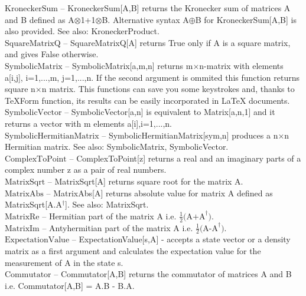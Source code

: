 \documentclass[a4paper,10pt]{scrartcl}
\begin{document}
\noindent\textbf{$ \text{KroneckerSum} $ }-- KroneckerSum[A,B] returns the Kronecker sum of matrices A and B defined as A$\otimes $1+1$\otimes $B. Alternative syntax A$\oplus $B for KroneckerSum[A,B] is also provided. See also: KroneckerProduct.$  $\\[8pt]
\noindent\textbf{$ \text{SquareMatrixQ} $ }-- SquareMatrixQ[A] returns True only if A is a square matrix, and gives False otherwise.$  $\\[8pt]
\noindent\textbf{$ \text{SymbolicMatrix} $ }-- SymbolicMatrix[a,m,n] returns m$\times $n-matrix with elements a[i,j], i=1,...,m, j=1,...,n. If the second argument is ommited this function returns square n$\times $n matrix. This functions can save you some keystrokes and, thanks to TeXForm function, its results can be easily incorporated in LaTeX documents.$  $\\[8pt]
\noindent\textbf{$ \text{SymbolicVector} $ }-- SymbolicVector[a,n] is equivalent to Matrix[a,n,1] and it returns a vector with m elements a[i],i=1,...,n.$  $\\[8pt]
\noindent\textbf{$ \text{SymbolicHermitianMatrix} $ }-- SymbolicHermitianMatrix[sym,n] produces a n$\times $n Hermitian matrix. See also: SymbolicMatrix, SymbolicVector.$  $\\[8pt]
\noindent\textbf{$ \text{ComplexToPoint} $ }-- ComplexToPoint[z] returns a real and an imaginary parts of a complex number z as a pair of real numbers.$  $\\[8pt]
\noindent\textbf{$ \text{MatrixSqrt} $ }-- MatrixSqrt[A] returns square root for the matrix A.$  $\\[8pt]
\noindent\textbf{$ \text{MatrixAbs} $ }-- MatrixAbs[A] returns absolute value for matrix A defined as MatrixSqrt[A.A$  ^{\dagger } $]. See also: MatrixSqrt.$  $\\[8pt]
\noindent\textbf{$ \text{MatrixRe} $ }-- Hermitian part of the matrix A i.e. $ \frac{1}{2}\text{(A+A} ^{\dagger }\text{).} $\\[8pt]
\noindent\textbf{$ \text{MatrixIm} $ }-- Antyhermitian part of the matrix A i.e. $ \frac{1}{2}\text{(A-A} ^{\dagger }\text{).} $\\[8pt]
\noindent\textbf{$ \text{ExpectationValue} $ }-- ExpectationValue[s,A] - accepts a state vector or a density matrix as a first argument and calculates the expectation value for the measurement of A in the state s.$  $\\[8pt]
\noindent\textbf{$ \text{Commutator} $ }-- Commutator[A,B] returns the commutator of matrices A and B i.e. Commutator[A,B] = A.B - B.A.$  $\\[8pt]
\end{document}
